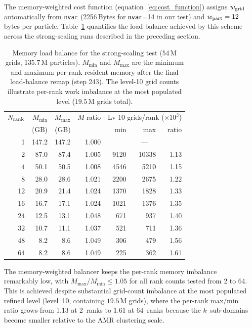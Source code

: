 \documentclass[fleqn,usenatbib]{mnras}
\newcommand{\nrank}{N_{\rm rank}}
\newcommand{\ksec}{\ensuremath{k}\text{-section}}
\newcommand{\code}[1]{\texttt{#1}}
\begin{document}
The memory-weighted cost function (equation~\ref{eq:cost_function})
assigns $w_{\rm grid}$ automatically from \code{nvar} (2256\,Bytes for
\code{nvar}=14 in our test) and $w_{\rm part} = 12$ bytes per particle.
Table~\ref{tab:membal} quantifies the load balance achieved by this
scheme across the strong-scaling runs described in the preceding section.
\begin{table}
\centering
\caption{Memory load balance for the strong-scaling test
  ($54\,\mathrm{M}$ grids, $135.7\,\mathrm{M}$ particles).
  $M_{\min}$ and $M_{\max}$ are the minimum and maximum per-rank
  resident memory after the final load-balance remap (step 243).
  The level-10 grid counts illustrate per-rank work imbalance
  at the most populated level ($19.5\,\mathrm{M}$ grids total).}
\label{tab:membal}
\small
\begin{tabular}{rrrrrrr}
\hline
$\nrank$ & $M_{\min}$ & $M_{\max}$ & $M$ ratio
  & \multicolumn{3}{c}{Lv-10 grids/rank ($\times 10^3$)} \\
  &  (GB) & (GB) &
  & min & max & ratio \\
\hline
  1 & 147.2 & 147.2 & 1.000  &\multicolumn{3}{c}{---} \\
  2 &  87.0 &  87.4 & 1.005  & 9120 & 10338 & 1.13 \\
  4 &  50.1 &  50.5 & 1.008  & 4546 &  5210 & 1.15 \\
  8 &  28.0 &  28.6 & 1.021  & 2200 &  2675 & 1.22 \\
 12 &  20.9 &  21.4 & 1.024  & 1370 &  1828 & 1.33 \\
 16 &  16.7 &  17.1 & 1.024  & 1021 &  1376 & 1.35 \\
 24 &  12.5 &  13.1 & 1.048  &  671 &   937 & 1.40 \\
 32 &  10.7 &  11.1 & 1.037  &  521 &   711 & 1.36 \\
 48 &   8.2 &   8.6 & 1.049  &  306 &   479 & 1.56 \\
 64 &   8.2 &   8.6 & 1.049  &  225 &   362 & 1.61 \\
\hline
\end{tabular}
\end{table}

The memory-weighted balancer keeps the per-rank memory imbalance remarkably low, with $M_{\max}/M_{\min} \le 1.05$ for all rank counts tested from 2 to 64.  This is achieved despite substantial grid-count imbalance
at the most populated refined level (level~10, containing
$19.5\,\mathrm{M}$ grids), where the per-rank max/min ratio grows from
1.13 at 2~ranks to 1.61 at 64~ranks because the \ksec\ sub-domains
become smaller relative to the AMR clustering scale.
\end{document}
